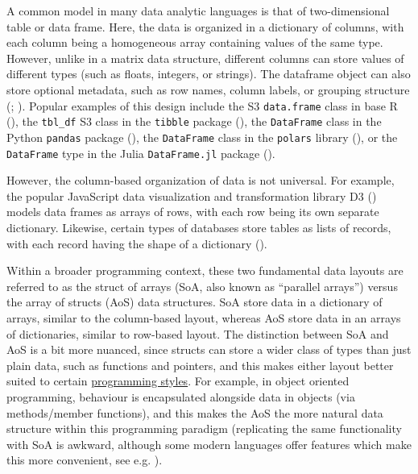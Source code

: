 \documentclass[
]{book}
\theoremstyle{definition}
\theoremstyle{definition}
\theoremstyle{definition}
\theoremstyle{definition}
\theoremstyle{remark}
\begin{document}
A common model in many data analytic languages is that of two-dimensional table or data frame. Here, the data is organized in a dictionary of columns, with each column being a homogeneous array containing values of the same type. However, unlike in a matrix data structure, different columns can store values of different types (such as floats, integers, or strings). The dataframe object can also store optional metadata, such as row names, column labels, or grouping structure (; ). Popular examples of this design include the S3 \texttt{data.frame} class in base R (), the \texttt{tbl\_df} S3 class in the \texttt{tibble} package (), the \texttt{DataFrame} class in the Python \texttt{pandas} package (), the \texttt{DataFrame} class in the \texttt{polars} library (), or the \texttt{DataFrame} type in the Julia \texttt{DataFrame.jl} package ().

However, the column-based organization of data is not universal. For example, the popular JavaScript data visualization and transformation library D3 () models data frames as arrays of rows, with each row being its own separate dictionary. Likewise, certain types of databases store tables as lists of records, with each record having the shape of a dictionary ().

Within a broader programming context, these two fundamental data layouts are referred to as the struct of arrays (SoA, also known as ``parallel arrays'') versus the array of structs (AoS) data structures. SoA store data in a dictionary of arrays, similar to the column-based layout, whereas AoS store data in an arrays of dictionaries, similar to row-based layout. The distinction between SoA and AoS is a bit more nuanced, since structs can store a wider class of types than just plain data, such as functions and pointers, and this makes either layout better suited to certain \hyperref[programming-paradigms]{programming styles}. For example, in object oriented programming, behaviour is encapsulated alongside data in objects (via methods/member functions), and this makes the AoS the more natural data structure within this programming paradigm (replicating the same functionality with SoA is awkward, although some modern languages offer features which make this more convenient, see e.g. ).
\end{document}
